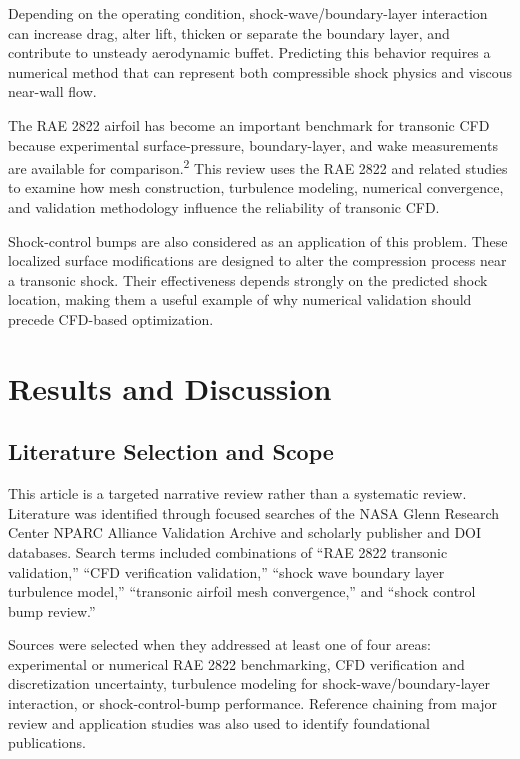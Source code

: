 \documentclass[10pt]{article}
\newcommand{\supercite}[1]{\textsuperscript{#1}}
\begin{document}
Depending on the operating condition, shock-wave/boundary-layer
interaction can increase drag, alter lift, thicken or separate the
boundary layer, and contribute to unsteady aerodynamic buffet.
Predicting this behavior requires a numerical method that can represent
both compressible shock physics and viscous near-wall flow.

The RAE 2822 airfoil has become an important benchmark for transonic CFD
because experimental surface-pressure, boundary-layer, and wake
measurements are available for comparison.\supercite{2} This review
uses the RAE 2822 and related studies to examine how mesh construction,
turbulence modeling, numerical convergence, and validation methodology
influence the reliability of transonic CFD.

Shock-control bumps are also considered as an application of this
problem. These localized surface modifications are designed to alter
the compression process near a transonic shock. Their effectiveness
depends strongly on the predicted shock location, making them a useful
example of why numerical validation should precede CFD-based
optimization.


\section{Results and Discussion}


\subsection{Literature Selection and Scope}

This article is a targeted narrative review rather than a systematic
review. Literature was identified through focused searches of the NASA
Glenn Research Center NPARC Alliance Validation Archive and scholarly
publisher and DOI databases. Search terms included combinations of
``RAE 2822 transonic validation,'' ``CFD verification validation,''
``shock wave boundary layer turbulence model,'' ``transonic airfoil
mesh convergence,'' and ``shock control bump review.''

Sources were selected when they addressed at least one of four areas:
experimental or numerical RAE 2822 benchmarking, CFD verification and
discretization uncertainty, turbulence modeling for
shock-wave/boundary-layer interaction, or shock-control-bump
performance. Reference chaining from major review and application
studies was also used to identify foundational publications.
\end{document}
